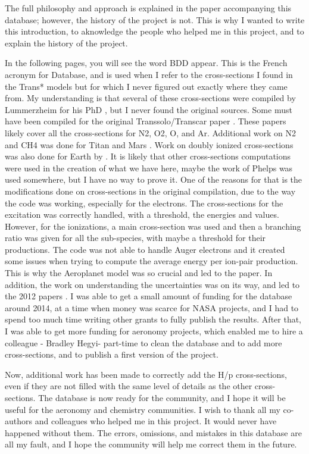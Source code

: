 The full philosophy and approach is explained in the paper accompanying this database; however, the history of the project is not. This is why I wanted to write this introduction, to aknowledge the people who helped me in this project, and to explain the history of the project.

In the following pages, you will see the word BDD appear. This is the French acronym for Database, and is used when I refer to the cross-sections I found in the Trans* models but for which I never figured out exactly where they came from. 
My understanding is that several of these cross-sections were compiled by Lummerzheim for his PhD \citep{Lummerzheim1987}, but I never found the original sources.  Some must have been compiled for the original Transsolo/Transcar paper \citep{Lummerzheim1994}. These papers likely cover all the cross-sections for N2, O2, O, and Ar. Additional work on N2 and CH4 was done for Titan \citep{Lilensten2005} and Mars \cite{Witasse2002, Witasse2003}. Work on doubly ionized cross-sections was also done for Earth by  \citep{Simon2005}. 
It is likely that other cross-sections computations were used in the creation of what we have here, maybe the work of Phelps \cite{phelps1972} was used somewhere, but I have no way to prove it. One of the reasons for that is the modifications done on cross-sections in the original compilation, due to the way the code was working, especially for the electrons. The cross-sections for the excitation was correctly handled, with a threshold, the energies and values. However, for the ionizations, a main cross-section was used and then a branching ratio was given for all the sub-species, with maybe a threshold for their productions. The code was not able to handle Auger electrons and it created some issues when trying to compute the average energy per ion-pair production. This is why the Aeroplanet model was so crucial and led to the \cite{SimonWedlund2011} paper. In addition, the work on understanding the uncertainties was on its way, and led to the 2012 papers \cite{Gronoff2012, Gronoff2012b}.
I was able to get a small amount of funding for the database around 2014, at a time when money was scarce for NASA projects, and I had to spend too much time writing other grants to fully publish the results.  After that, I was able to get more funding for aeronomy projects, which enabled me to hire a colleague - Bradley Hegyi- part-time to clean the database and to add more cross-sections, and to publish a first version of the project.

Now, additional work has been made to correctly add the H/p cross-sections, even if they are not filled with the same level of details as the other cross-sections. The database is now ready for the community, and I hope it will be useful for the aeronomy and chemistry communities.
I wish to thank all my co-authors and colleagues who helped me in this project. It would never have happened without them.
The errors, omissions, and mistakes in this database are all my fault, and I hope the community will help me correct them in the future.


